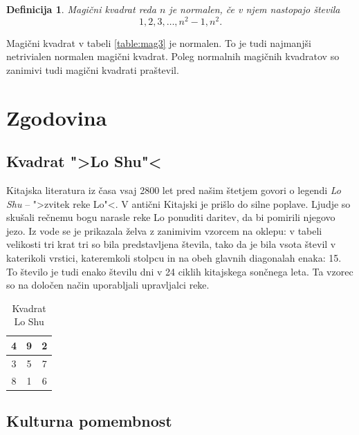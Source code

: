 \documentclass[a4paper,12pt]{article}
\newcommand{\pojem}[1]{\emph{\color{purple}#1}}
\newenvironment{magic}[3]{\begin{table}[!ht]
   \large
   \centering
   \caption{#1}
   \label{#2}
   \begin{tabular}{|*{#3}{c|}}
      \hline}
{\end{tabular}
\end{table}}
\newtheorem{definicija}{Definicija}
\begin{document}
\begin{definicija}
   Magični kvadrat reda $n$ je \pojem{normalen}, če v njem nastopajo števila
   \begin{equation}
      \label{eq:numbers}
      1, 2, 3, \ldots, n^2-1, n^2.
   \end{equation}
\end{definicija}

Magični kvadrat v tabeli \ref{table:mag3} je normalen.
To je tudi najmanjši netrivialen normalen magični kvadrat.
Poleg normalnih magičnih kvadratov so zanimivi tudi magični kvadrati praštevil.


\section{Zgodovina}

\subsection{Kvadrat ">Lo Shu"<}

Kitajska literatura iz časa vsaj 2800 let pred našim štetjem govori o legendi
\pojem{Lo Shu} -- ">zvitek reke Lo"<. V antični Kitajski je prišlo do
silne poplave. Ljudje so skušali rečnemu bogu narasle reke Lo ponuditi daritev,
da bi pomirili njegovo jezo. Iz vode se je prikazala želva z zanimivim vzorcem
na oklepu: v tabeli velikosti tri krat tri so bila predstavljena števila, tako
da je bila vsota števil v katerikoli vrstici, kateremkoli stolpcu in na obeh
glavnih diagonalah enaka: 15. To število je tudi enako številu dni v 24 ciklih
kitajskega sončnega leta. Ta vzorec so na določen način uporabljali upravljalci
reke.

\begin{magic}{Kvadrat Lo Shu}{table:loshu}{3}
	4 & 9 & 2 \\\hline
   3 & 5 & 7 \\\hline
   8 & 1 & 6 \\\hline
\end{magic}


\subsection{Kulturna pomembnost}
\end{document}
